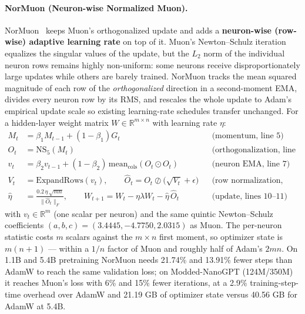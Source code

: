 \paragraph{NorMuon (Neuron-wise Normalized Muon).}
NorMuon~\citep{li_normuon_2025} keeps Muon's orthogonalized update and adds a
\textbf{neuron-wise (row-wise) adaptive learning rate} on top of it. Muon's
Newton--Schulz iteration equalizes the singular values of the update, but the $L_2$ norm
of the individual neuron rows remains highly non-uniform: some neurons receive
disproportionately large updates while others are barely trained. NorMuon tracks the
mean squared magnitude of each row of the \emph{orthogonalized} direction in a
second-moment EMA, divides every neuron row by its RMS, and rescales the whole update to
Adam's empirical update scale so existing learning-rate schedules transfer unchanged.
For a hidden-layer weight matrix $W \in \mathbb{R}^{m \times n}$ with learning rate
$\eta$:
\begin{align}
M_t &= \beta_1 M_{t-1} + (1-\beta_1) G_t && \text{(momentum, line 5)} \\
O_t &= \mathrm{NS}_5(M_t) && \text{(orthogonalization, line 6)} \\
v_t &= \beta_2 v_{t-1} + (1-\beta_2)\,\mathrm{mean}_{\mathrm{cols}}(O_t \odot O_t) && \text{(neuron EMA, line 7)} \\
V_t &= \mathrm{ExpandRows}(v_t), \qquad \widehat{O}_t = O_t \oslash \big(\sqrt{V_t} + \epsilon\big) && \text{(row normalization, lines 8--9)} \\
\hat\eta &= \frac{0.2\,\eta\,\sqrt{mn}}{\lVert \widehat{O}_t \rVert_F}, \qquad
W_{t+1} = W_t - \eta\lambda W_t - \hat\eta\,\widehat{O}_t && \text{(update, lines 10--11)}
\end{align}
with $v_t \in \mathbb{R}^m$ (one scalar per neuron) and the same quintic Newton--Schulz
coefficients $(a,b,c)=(3.4445,-4.7750,2.0315)$ as Muon. The per-neuron statistic costs
$m$ scalars against the $m \times n$ first moment, so optimizer state is $m(n+1)$ ---
within a $1/n$ factor of Muon and roughly half of Adam's $2mn$. On 1.1B and 5.4B
pretraining NorMuon needs 21.74\% and 13.91\% fewer steps than AdamW to reach the same
validation loss; on Modded-NanoGPT (124M/350M) it reaches Muon's loss with 6\% and 15\%
fewer iterations, at a 2.9\% training-step-time overhead over AdamW and 21.19 GB of
optimizer state versus 40.56 GB for AdamW at 5.4B.

